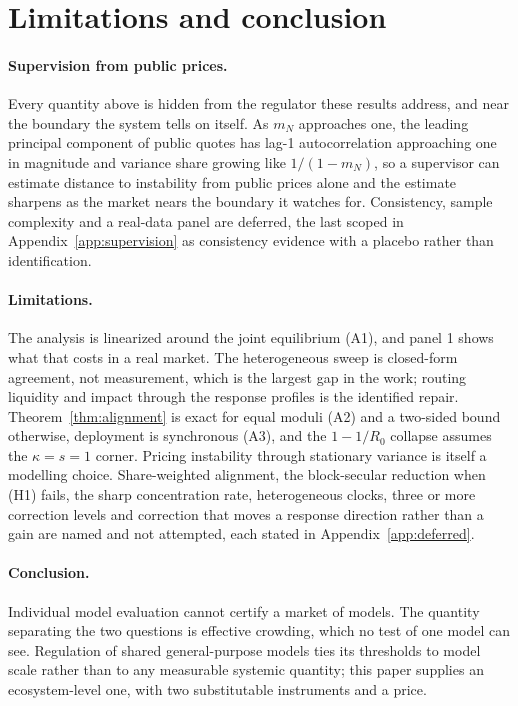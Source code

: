 \documentclass{article}
\theoremstyle{plain}
\theoremstyle{definition}
\newcommand{\mN}{m_N}
\begin{document}
\section{Limitations and conclusion}
\label{sec:limitations}

\paragraph{Supervision from public prices.}
Every quantity above is hidden from the regulator these results address, and near the boundary the system tells on itself. As $\mN$ approaches one, the leading principal component of public quotes has lag-1 autocorrelation approaching one in magnitude and variance share growing like $1/(1-\mN)$, so a supervisor can estimate distance to instability from public prices alone and the estimate sharpens as the market nears the boundary it watches for. Consistency, sample complexity and a real-data panel are deferred, the last scoped in Appendix~\ref{app:supervision} as consistency evidence with a placebo rather than identification.

\paragraph{Limitations.}
The analysis is linearized around the joint equilibrium (A1), and panel 1 shows what that costs in a real market. The heterogeneous sweep is closed-form agreement, not measurement, which is the largest gap in the work; routing liquidity and impact through the response profiles is the identified repair. Theorem~\ref{thm:alignment} is exact for equal moduli (A2) and a two-sided bound otherwise, deployment is synchronous (A3), and the $1-1/R_0$ collapse assumes the $\kappa=s=1$ corner. Pricing instability through stationary variance is itself a modelling choice. Share-weighted alignment, the block-secular reduction when (H1) fails, the sharp concentration rate, heterogeneous clocks, three or more correction levels and correction that moves a response direction rather than a gain are named and not attempted, each stated in Appendix~\ref{app:deferred}.

\paragraph{Conclusion.}
Individual model evaluation cannot certify a market of models. The quantity separating the two questions is effective crowding, which no test of one model can see. Regulation of shared general-purpose models ties its thresholds to model scale rather than to any measurable systemic quantity; this paper supplies an ecosystem-level one, with two substitutable instruments and a price.
\end{document}

